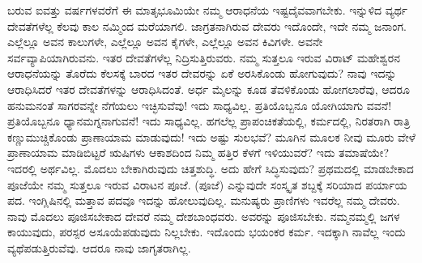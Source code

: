 ಬರುವ ಐವತ್ತು ವರ್ಷಗಳವರೆಗೆ ಈ ಮಾತೃಭೂಮಿಯೇ ನಮ್ಮ ಆರಾಧನೆಯ ಇಷ್ಟದೈವವಾಗಬೇಕು. ಇನ್ನುಳಿದ ವ್ಯರ್ಥ ದೇವತೆಗಳೆಲ್ಲ ಕೆಲವು ಕಾಲ ನಮ್ಮಿಂದ ಮರೆಯಾಗಲಿ. ಜಾಗ್ರತನಾಗಿರುವ ದೇವರು ಇದೊಂದೇ, ಇದೇ ನಮ್ಮ ಜನಾಂಗ. ಎಲ್ಲೆಲ್ಲೂ ಅವನ ಕಾಲುಗಳೇ, ಎಲ್ಲೆಲ್ಲೂ ಅವನ ಕೈಗಳೇ, ಎಲ್ಲೆಲ್ಲೂ ಅವನ ಕಿವಿಗಳೇ. ಅವನೇ ಸರ್ವವ್ಯಾಪಿಯಾಗಿರುವನು. ಇತರ ದೇವತೆಗಳೆಲ್ಲ ನಿದ್ರಿಸುತ್ತಿರುವರು. ನಮ್ಮ ಸುತ್ತಲೂ ಇರುವ ವಿರಾಟ್​ ಮಹೇಶ್ವರನ ಆರಾಧನೆಯನ್ನು ತೊರೆದು ಕೆಲಸಕ್ಕೆ ಬಾರದ ಇತರ ದೇವರನ್ನು ಏಕೆ ಅರಸಿಕೊಂಡು ಹೋಗುವುದು? ನಾವು ಇದನ್ನು ಆರಾಧಿಸಿದರೆ ಇತರ ದೇವತೆಗಳನ್ನು ಆರಾಧಿಸಿದಂತೆ. ಅರ್ಧ ಮೈಲನ್ನು ಕೂಡ ತೆವಳಿಕೊಂಡು ಹೋಗಲಾರೆವು, ಆದರೂ ಹನುಮನಂತೆ ಸಾಗರವನ್ನೇ ನೆಗೆಯಲು ಇಚ್ಛಿಸುವೆವು! ಇದು ಸಾಧ್ಯವಿಲ್ಲ. ಪ್ರತಿಯೊಬ್ಬನೂ ಯೋಗಿಯಾಗು ವವನೆ! ಪ್ರತಿಯೊಬ್ಬನೂ ಧ್ಯಾನಮಗ್ನನಾಗುವನೆ! ಇದು ಸಾಧ್ಯವಿಲ್ಲ. ಹಗಲೆಲ್ಲ ಪ್ರಾಪಂಚಿಕತೆಯಲ್ಲಿ, ಕರ್ಮದಲ್ಲಿ, ನಿರತರಾಗಿ ರಾತ್ರಿ ಕಣ್ಣುಮುಚ್ಚಿಕೊಂಡು ಪ್ರಾಣಾಯಾಮ ಮಾಡುವುದು! ಇದು ಅಷ್ಟು ಸುಲಭವೆ? ಮೂಗಿನ ಮೂಲಕ ನೀವು ಮೂರು ವೇಳೆ ಪ್ರಾಣಾಯಾಮ ಮಾಡಿಬಿಟ್ಟರೆ ಋಷಿಗಳು ಆಕಾಶದಿಂದ ನಿಮ್ಮ ಹತ್ತಿರ ಕೆಳಗೆ ಇಳಿಯುವರೆ? ಇದು ತಮಾಷೆಯೇ? ಇದರಲ್ಲಿ ಅರ್ಥವಿಲ್ಲ. ಮೊದಲು ಬೇಕಾಗಿರುವುದು ಚಿತ್ತಶುದ್ಧಿ. ಅದು ಹೇಗೆ ಸಿದ್ಧಿಸುವುದು? ಪ್ರಥಮದಲ್ಲಿ ಮಾಡಬೇಕಾದ ಪೂಜೆಯೇ ನಮ್ಮ ಸುತ್ತಲೂ ಇರುವ ವಿರಾಟನ ಪೂಜೆ.  (ಪೂಜೆ) ಎನ್ನುವುದೇ ಸಂಸ್ಕೃತ ಶಬ್ದಕ್ಕೆ ಸರಿಯಾದ ಪರ್ಯಾಯ ಪದ. ಇಂಗ್ಲಿಷಿನಲ್ಲಿ ಮತ್ತಾವ ಪದವೂ ಇದನ್ನು ಹೋಲುವುದಿಲ್ಲ. ಮನುಷ್ಯರು ಪ್ರಾಣಿಗಳು ಇವರೆಲ್ಲ ನಮ್ಮ ದೇವರು. ನಾವು ಮೊದಲು ಪೂಜಿಸಬೇಕಾದ ದೇವರೆ ನಮ್ಮ ದೇಶಬಾಂಧವರು. ಅವರನ್ನು ಪೂಜಿಸಬೇಕು. ನಮ್ಮನಮ್ಮಲ್ಲಿ ಜಗಳ ಕಾಯುವುದು, ಪರಸ್ಪರ ಅಸೂಯೆಪಡುವುದು ನಿಲ್ಲಬೇಕು. ಇದೊಂದು ಭಯಂಕರ ಕರ್ಮ. ಇದಕ್ಕಾಗಿ ನಾವೆಲ್ಲ ಇಂದು ವ್ಯಥೆಪಡುತ್ತಿರುವೆವು. ಆದರೂ ನಾವು ಜಾಗೃತರಾಗಿಲ್ಲ. 

